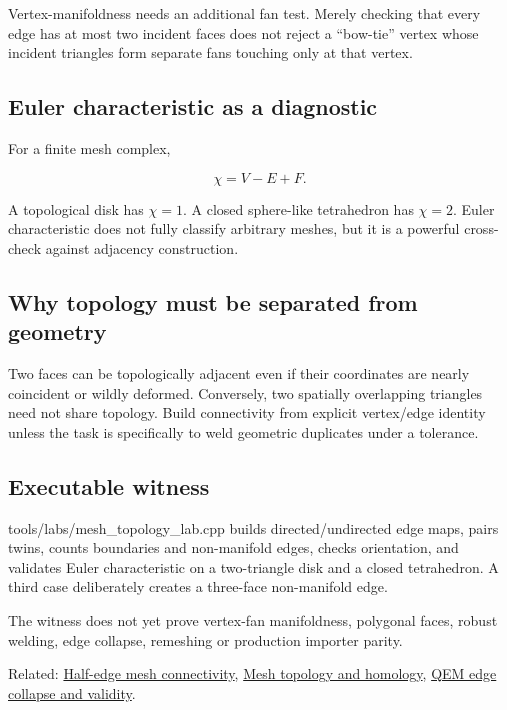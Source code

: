 Vertex-manifoldness needs an additional fan test. Merely checking that every edge has at most two incident faces does not reject a ``bow-tie'' vertex whose incident triangles form separate fans touching only at that vertex.

\subsection{Euler characteristic as a diagnostic}\label{appendix-faac749c9cdd-euler-characteristic-as-a-diagnostic}

For a finite mesh complex,

\[
\chi = V-E+F.
\]

A topological disk has \(\chi=1\). A closed sphere-like tetrahedron has \(\chi=2\). Euler characteristic does not fully classify arbitrary meshes, but it is a powerful cross-check against adjacency construction.

\subsection{Why topology must be separated from geometry}\label{appendix-faac749c9cdd-why-topology-must-be-separated-from-geometry}

Two faces can be topologically adjacent even if their coordinates are nearly coincident or wildly deformed. Conversely, two spatially overlapping triangles need not share topology. Build connectivity from explicit vertex/edge identity unless the task is specifically to weld geometric duplicates under a tolerance.

\subsection{Executable witness}\label{appendix-faac749c9cdd-executable-witness}

tools/labs/mesh\_topology\_lab.cpp builds directed/undirected edge maps, pairs twins, counts boundaries and non-manifold edges, checks orientation, and validates Euler characteristic on a two-triangle disk and a closed tetrahedron. A third case deliberately creates a three-face non-manifold edge.

The witness does not yet prove vertex-fan manifoldness, polygonal faces, robust welding, edge collapse, remeshing or production importer parity.

Related: \hyperref[appendix-1aea26b2307f]{Half-edge mesh connectivity}, \hyperref[appendix-e38976cbbf86]{Mesh topology and homology}, \hyperref[appendix-89db9fe1bc8a]{QEM edge collapse and validity}.
